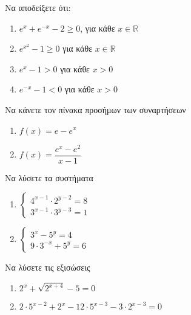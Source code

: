 \documentclass{../presentation}
\begin{document}
\begin{askisi}

  Να αποδείξετε ότι:
  \begin{enumerate}
    \item<1-> $e^x+e^{-x}-2\ge 0$, για κάθε $x\in \mathbb{R}$
    \item<2-> $e^{x^2}-1\ge 0$ για κάθε $x\in\mathbb{R}$
    \item<3-> $e^x-1>0$ για κάθε $x>0$
    \item<4-> $e^{-x}-1<0$ για κάθε $x>0$
  \end{enumerate}


\end{askisi}

\begin{askisi}
  Να κάνετε τον πίνακα προσήμων των συναρτήσεων
  \begin{enumerate}
    \item<1-> $f(x)=e-e^x$
    \item<2-> $f(x)=\dfrac{e^x-e^2}{x-1}$
  \end{enumerate}


\end{askisi}

\begin{askisi}
  Να λύσετε τα συστήματα
  \begin{enumerate}
    \item<1-> $\begin{cases}
              4^{x-1}\cdot 2^{y-2}=8 \\
              3^{x-1}\cdot 3^{y-3}=1
            \end{cases}$
    \item<2-> $\begin{cases}
              3^{x}- 5^{y}=4 \\
              9\cdot 3^{-x}+ 5^{y}=6
            \end{cases}$
  \end{enumerate}


\end{askisi}

\begin{askisi}
  Να λύσετε τις εξισώσεις
  \begin{enumerate}
    \item<1-> $2^x+\sqrt{2^{x+4}}-5=0$
    \item<2-> $2\cdot 5^{x-2}+2^x-12\cdot 5^{x-3}-3\cdot 2^{x-3}=0$
  \end{enumerate}


\end{askisi}
\end{document}
